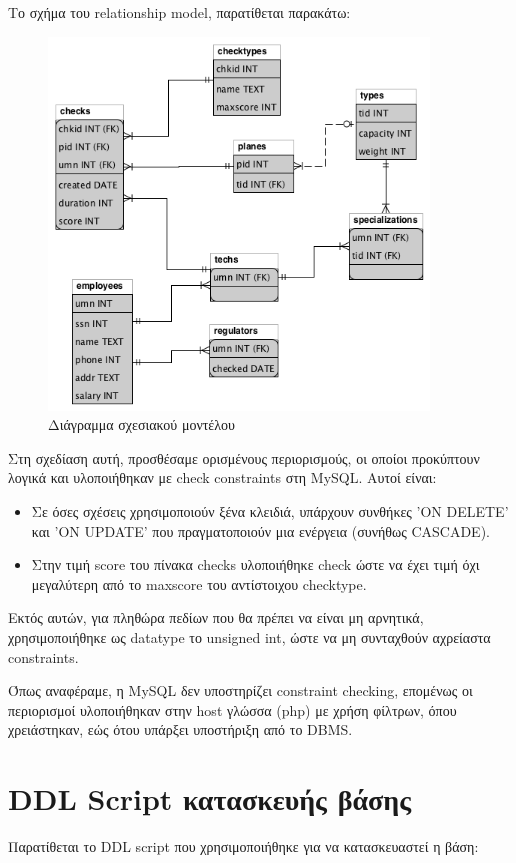 \documentclass[a4paper]{article}
\begin{document}
Το σχήμα του relationship model, παρατίθεται παρακάτω:

\begin{figure}[h]
\centering
\includegraphics[width=0.9\textwidth]{files/r-db.png}
\caption{Διάγραμμα σχεσιακού μοντέλου}
\end{figure}

Στη σχεδίαση αυτή, προσθέσαμε ορισμένους περιορισμούς, οι οποίοι προκύπτουν
λογικά και υλοποιήθηκαν με check constraints στη MySQL. Αυτοί είναι:

\begin{itemize}
\item Σε όσες σχέσεις χρησιμοποιούν ξένα κλειδιά, υπάρχουν συνθήκες 'ON
DELETE' και 'ON UPDATE' που πραγματοποιούν μια ενέργεια (συνήθως CASCADE).
\item Στην τιμή score του πίνακα checks υλοποιήθηκε check ώστε να έχει τιμή
όχι μεγαλύτερη από το maxscore του αντίστοιχου checktype.
\end{itemize}

Εκτός αυτών, για πληθώρα πεδίων που θα πρέπει να είναι μη αρνητικά,
χρησιμοποιήθηκε ως datatype το unsigned int, ώστε να μη συνταχθούν αχρείαστα
constraints.

Όπως αναφέραμε, η MySQL δεν υποστηρίζει constraint checking, επομένως οι
περιορισμοί υλοποιήθηκαν στην host γλώσσα (php) με χρήση φίλτρων, όπου
χρειάστηκαν, εώς ότου υπάρξει υποστήριξη από το DBMS.


\section{DDL Script κατασκευής βάσης}
Παρατίθεται το DDL script που χρησιμοποιήθηκε για να κατασκευαστεί η βάση:






\end{document}
